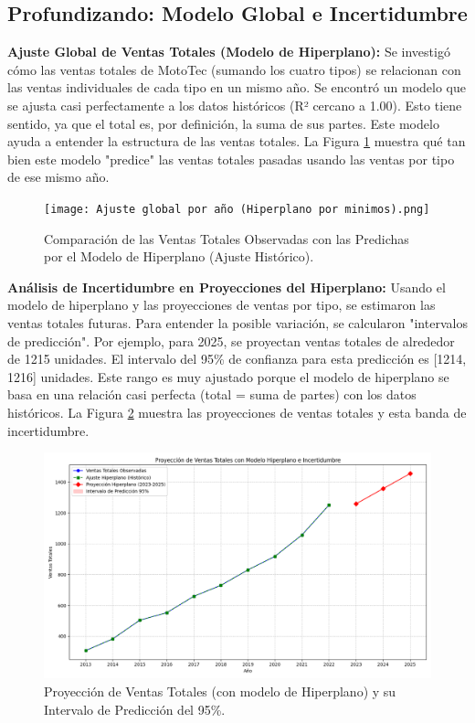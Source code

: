 \documentclass[12pt,a4paper]{article}
\begin{document}
\subsection{Profundizando: Modelo Global e Incertidumbre}
\textbf{Ajuste Global de Ventas Totales (Modelo de Hiperplano):}
Se investigó cómo las ventas totales de MotoTec (sumando los cuatro tipos) se relacionan con las ventas individuales de cada tipo en un mismo año. Se encontró un modelo que se ajusta casi perfectamente a los datos históricos (R² cercano a 1.00). Esto tiene sentido, ya que el total es, por definición, la suma de sus partes. Este modelo ayuda a entender la estructura de las ventas totales. La Figura \ref{fig:ajuste_global_hiperplano_img} muestra qué tan bien este modelo "predice" las ventas totales pasadas usando las ventas por tipo de ese mismo año.
\begin{figure}[H]
\centering
\texttt{[image: Ajuste global por año (Hiperplano por minimos).png]}
\caption{Comparación de las Ventas Totales Observadas con las Predichas por el Modelo de Hiperplano (Ajuste Histórico).}
\label{fig:ajuste_global_hiperplano_img}
\end{figure}

\textbf{Análisis de Incertidumbre en Proyecciones del Hiperplano:}
Usando el modelo de hiperplano y las proyecciones de ventas por tipo, se estimaron las ventas totales futuras. Para entender la posible variación, se calcularon "intervalos de predicción". Por ejemplo, para 2025, se proyectan ventas totales de alrededor de 1215 unidades. El intervalo del 95\% de confianza para esta predicción es [1214, 1216] unidades. Este rango es muy ajustado porque el modelo de hiperplano se basa en una relación casi perfecta (total = suma de partes) con los datos históricos. La Figura \ref{fig:proyeccion_hiperplano_incertidumbre_img} muestra las proyecciones de ventas totales y esta banda de incertidumbre.
\begin{figure}[H]
\centering
\includegraphics[width=\textwidth]{Proyeccion de ventas totales con modelo hiperplano e incertidumbre.png}
\caption{Proyección de Ventas Totales (con modelo de Hiperplano) y su Intervalo de Predicción del 95\%.}
\label{fig:proyeccion_hiperplano_incertidumbre_img}
\end{figure}
\end{document}
